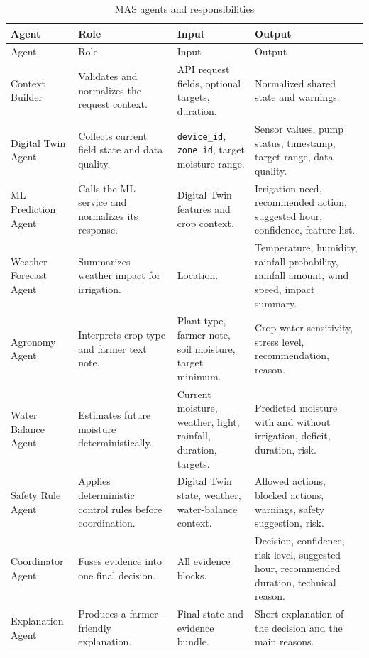 \begin{footnotesize}
\setlength{\tabcolsep}{2pt}
\renewcommand{\arraystretch}{1.12}
\begin{longtable}{@{}>{\raggedright\arraybackslash}p{}>{\raggedright\arraybackslash}p{}>{\raggedright\arraybackslash}p{}>{\raggedright\arraybackslash}p{}@{}}
\caption{MAS agents and responsibilities}
\label{tab:mas_agents}\\
\toprule
Agent & Role & Input & Output \\
\midrule
\endfirsthead
\toprule
Agent & Role & Input & Output \\
\midrule
\endhead
Context Builder & Validates and normalizes the request context. & API request fields, optional targets, duration. & Normalized shared state and warnings. \\
Digital Twin Agent & Collects current field state and data quality. & \texttt{device\_id}, \texttt{zone\_id}, target moisture range. & Sensor values, pump status, timestamp, target range, data quality. \\
ML Prediction Agent & Calls the ML service and normalizes its response. & Digital Twin features and crop context. & Irrigation need, recommended action, suggested hour, confidence, feature list. \\
Weather Forecast Agent & Summarizes weather impact for irrigation. & Location. & Temperature, humidity, rainfall probability, rainfall amount, wind speed, impact summary. \\
Agronomy Agent & Interprets crop type and farmer text note. & Plant type, farmer note, soil moisture, target minimum. & Crop water sensitivity, stress level, recommendation, reason. \\
Water Balance Agent & Estimates future moisture deterministically. & Current moisture, weather, light, rainfall, duration, targets. & Predicted moisture with and without irrigation, deficit, duration, risk. \\
Safety Rule Agent & Applies deterministic control rules before coordination. & Digital Twin state, weather, water-balance context. & Allowed actions, blocked actions, warnings, safety suggestion, risk. \\
Coordinator Agent & Fuses evidence into one final decision. & All evidence blocks. & Decision, confidence, risk level, suggested hour, recommended duration, technical reason. \\
Explanation Agent & Produces a farmer-friendly explanation. & Final state and evidence bundle. & Short explanation of the decision and the main reasons. \\
\bottomrule
\end{longtable}
\end{footnotesize}

